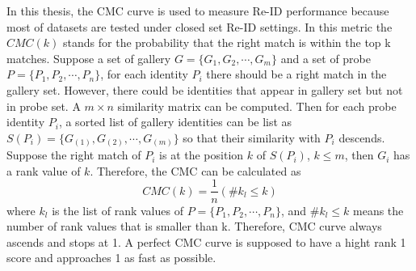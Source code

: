 In this thesis, the CMC curve is used to measure Re-ID performance because most of datasets are tested under closed set Re-ID settings. In this metric the $CMC(k)$ stands for the probability that the right match is within the top k matches. Suppose a set of gallery $G = \{G_1,G_2,\cdots,G_m\}$ and a set of probe $P = \{P_1,P_2,\cdots,P_n\}$, for each identity $P_i$ there should be a right match in the gallery set. However, there could be identities that appear in gallery set but not in probe set. A $m\times n$ similarity matrix can be computed. Then for each probe identity $P_i$, a sorted list of gallery identities can be list as $S(P_i) = \{{G_{(1)},G_{(2)},\cdots,G_{(m)}}\}$ so that their similarity with $P_i$ descends. Suppose the right match of $P_i$ is at the position $k$ of $S(P_i)$, $k\le m$, then $G_i$ has a rank value of $k$. Therefore, the CMC can be calculated as 
\begin{equation}
CMC(k) = \frac{1}{n}(\#k_l\le k)
\end{equation}
where $k_l$ is the list of rank values of $P = \{P_1,P_2,\cdots,P_n\}$, and $\#k_l\le k$ means the number of rank values that is smaller than k.  Therefore, CMC curve always ascends and stops at 1.  A perfect CMC curve is supposed to have a hight rank 1 score and approaches 1 as fast as possible.





